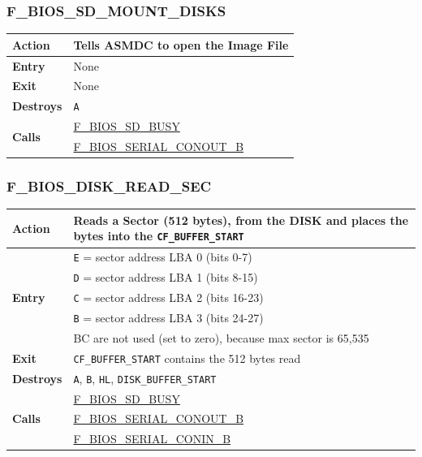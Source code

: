 \documentclass[a4paper,11pt]{article}
\begin{document}
        \subsubsection{F\_BIOS\_SD\_MOUNT\_DISKS}
        \label{func:fbiossdmountdisks}
        \begin{tabular}{l p{9cm}}
            \hline\textbf{Action}
            & Tells \textbf{ASMDC} to open the Image File\\
            \hline\textbf{Entry} & None \\
            \hline\textbf{Exit} & None \\
            \hline\textbf{Destroys} & \texttt{A} \\
            \hline\multirow[t]{2}{4em}{\textbf{Calls}} 
            & \hyperref[func:fbiossdbusywait]{F\_BIOS\_SD\_BUSY}\\
            & \hyperref[func:fbiosserialconoutb]{F\_BIOS\_SERIAL\_CONOUT\_B}\\
            \hline
        \end{tabular}

        \subsubsection{F\_BIOS\_DISK\_READ\_SEC}
        \label{func:fbiosdiskreadsec}
        \begin{tabular}{l p{9cm}}
            \hline\textbf{Action}
            & Reads a Sector (512 bytes), from the \textbf{DISK} and places the bytes into the \texttt{CF\_BUFFER\_START} \\
            \hline\multirow[t]{5}{4em}{\textbf{Entry}}
            & \texttt{E} = sector address LBA 0 (bits 0-7) \\
            & \texttt{D} = sector address LBA 1 (bits 8-15) \\
            & \texttt{C} = sector address LBA 2 (bits 16-23) \\
            & \texttt{B} = sector address LBA 3 (bits 24-27) \\
            & BC are not used (set to zero), because max sector is 65,535\\
            \hline\textbf{Exit} & \texttt{CF\_BUFFER\_START} contains the 512 bytes read \\
            \hline\textbf{Destroys} & \texttt{A}, \texttt{B}, \texttt{HL}, \texttt{DISK\_BUFFER\_START} \\
            \hline\multirow[t]{3}{4em}{\textbf{Calls}}
            & \hyperref[func:fbiossdbusywait]{F\_BIOS\_SD\_BUSY}\\
            & \hyperref[func:fbiosserialconoutb]{F\_BIOS\_SERIAL\_CONOUT\_B}\\
            & \hyperref[func:fbiosserialconinb]{F\_BIOS\_SERIAL\_CONIN\_B}\\
            \hline
        \end{tabular}
\end{document}
